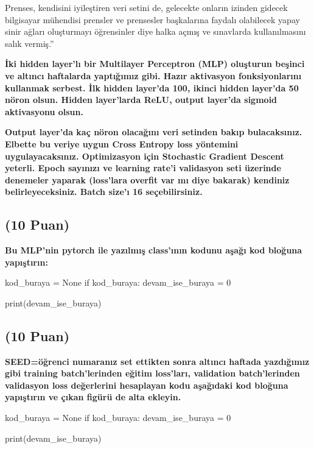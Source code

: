 \documentclass[11pt]{article}
\begin{document}
Prenses, kendisini iyileştiren veri setini de, gelecekte onların izinden gidecek bilgisayar mühendisi prensler ve prensesler başkalarına faydalı olabilecek yapay sinir ağları oluşturmayı öğrensinler diye halka açmış ve sınavlarda kullanılmasını salık vermiş.''

\textbf{İki hidden layer'lı bir Multilayer Perceptron (MLP) oluşturun beşinci ve altıncı haftalarda yaptığımız gibi. Hazır aktivasyon fonksiyonlarını kullanmak serbest. İlk hidden layer'da 100, ikinci hidden layer'da 50 nöron olsun. Hidden layer'larda ReLU, output layer'da sigmoid aktivasyonu olsun.}

\textbf{Output layer'da kaç nöron olacağını veri setinden bakıp bulacaksınız. Elbette bu veriye uygun Cross Entropy loss yöntemini uygulayacaksınız. Optimizasyon için Stochastic Gradient Descent yeterli. Epoch sayınızı ve learning rate'i validasyon seti üzerinde denemeler yaparak (loss'lara overfit var mı diye bakarak) kendiniz belirleyeceksiniz. Batch size'ı 16 seçebilirsiniz.}

\subsection{(10 Puan)} \textbf{Bu MLP'nin pytorch ile yazılmış class'ının kodunu aşağı kod bloğuna yapıştırın:}

\begin{python}
kod_buraya = None
if kod_buraya:
    devam_ise_buraya = 0

print(devam_ise_buraya)
\end{python}

\subsection{(10 Puan)} \textbf{SEED=öğrenci numaranız set ettikten sonra altıncı haftada yazdığımız gibi training batch'lerinden eğitim loss'ları, validation batch'lerinden validasyon loss değerlerini hesaplayan kodu aşağıdaki kod bloğuna yapıştırın ve çıkan figürü de alta ekleyin.}

\begin{python}
kod_buraya = None
if kod_buraya:
    devam_ise_buraya = 0

print(devam_ise_buraya)
\end{python}

\begin{comment}
\begin{figure}[ht!]
    \centering
    \texttt{[image: mypicturehere.png]}
    \caption{Buraya açıklama yazın}
    \label{fig:my_pic}
\end{figure}
\end{comment}
\end{document}
